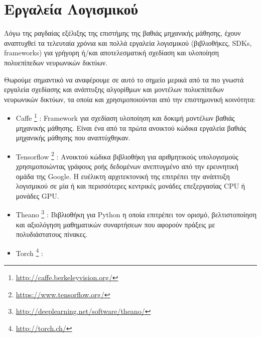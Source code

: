 \section{Εργαλεία Λογισμικού}
\label{sec:dnn_sw}

Λόγω της ραγδαίας εξέλιξης της επιστήμης της βαθιάς μηχανικής μάθησης,
έχουν αναπτυχθεί τα τελευταία χρόνια και πολλά εργαλεία λογισμικού (βιβλιοθήκες, SDKs, frameworks)
για γρήγορη ή/και αποτελεσματική σχεδίαση και υλοποίηση πολυεπίπεδων νευρωνικών δικτύων.

Θωρούμε σημαντικό να αναφέρουμε σε αυτό το σημείο μερικά από τα πιο γνωστά εργαλεία
σχεδίασης και ανάπτυξης αλγορίθμων και μοντέλων πολυεπίπεδων νευρωνικών δικτύων, τα οποία
και χρησιμοποιούνται από την επιστημονική κοινότητα:
\begin{itemize}
  \item{Caffe \footnote{\href{http://caffe.berkeleyvision.org/}{http://caffe.berkeleyvision.org/}} %
      \cite{jia2014caffe}:
    Framework για σχεδίαση υλοποίηση και δοκιμή μοντέλων βαθιάς μηχανικής μάθησης.
    Είναι ένα από τα πρώτα ανοικτού κώδικα εργαλεία βαθιάς μηχανικής μάθησης που αναπτύχθηκαν.}
  \item{Tensorflow \footnote{\href{https://www.tensorflow.org/}{https://www.tensorflow.org/}} %
      \cite{DBLP:journals/corr/AbadiBCCDDDGIIK16}:
    Ανοικτού κώδικα βιβλιοθήκη για αριθμητικούς υπολογισμούς χρησιμοποιώντας
    γράφους ροής δεδομένων ανεπτυγμένο από την ερευνητική ομάδα της Google.
    Η ευέλικτη αρχιτεκτονική της επιτρέπει την ανάπτυξη
    λογισμικού σε μία ή και περισσότερες κεντρικές μονάδες επεξεργασίας CPU ή μονάδες GPU.}
  \item{Theano \footnote{\href{http://deeplearning.net/software/theano/}{http://deeplearning.net/software/theano/}}
      \cite{2016arXiv160502688full}\cite{bergstra+al:2010-scipy}\cite{Bastien-Theano-2012}: %
      Βιβλιοθήκη για Python η οποία επιτρέπει τον ορισμό, βελτιστοποίηση και αξιολόγηση
      μαθηματικών συναρτήσεων που αφορούν πράξεις με πολυδιάστατους πίνακες.}
    \item{Torch \footnote{\href{http://torch.ch/}{http://torch.ch/}} %
        \cite{collobert2002torch}\cite{collobert2011torch7}\cite{collobert2012implementing}:
}
\end{itemize}

